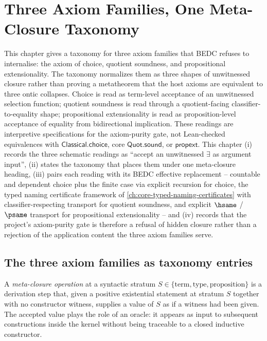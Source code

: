\chapter{Three Axiom Families, One Meta-Closure Taxonomy}
\label{ch:visions-three-axioms-one-closure}

This chapter gives a taxonomy for three axiom families that BEDC refuses to internalise: the axiom of choice, quotient soundness, and propositional extensionality. The taxonomy normalizes them as three shapes of unwitnessed closure rather than proving a metatheorem that the host axioms are equivalent to three ontic collapses. Choice is read as term-level acceptance of an unwitnessed selection function; quotient soundness is read through a quotient-facing classifier-to-equality shape; propositional extensionality is read as proposition-level acceptance of equality from bidirectional implication. These readings are interpretive specifications for the axiom-purity gate, not Lean-checked equivalences with $\mathsf{Classical.choice}$, core $\mathsf{Quot.sound}$, or $\mathsf{propext}$. This chapter (i) records the three schematic readings as ``accept an unwitnessed $\exists$ as argument input'', (ii) states the taxonomy that places them under one meta-closure heading, (iii) pairs each reading with its BEDC effective replacement -- countable and dependent choice plus the finite case via explicit recursion for choice, the typed naming certificate framework of \autoref{ch:core-typed-naming-certificates} with classifier-respecting transport for quotient soundness, and explicit $\hsame$ / $\psame$ transport for propositional extensionality -- and (iv) records that the project's axiom-purity gate is therefore a refusal of hidden closure rather than a rejection of the application content the three axiom families serve.

\section{The three axiom families as taxonomy entries}
\label{sec:three-axioms-one-closure-variants}

\begin{definition}
\label{def:three-axioms-meta-closure-operation}
A \emph{meta-closure operation} at a syntactic stratum $S \in \{\text{term}, \text{type}, \text{proposition}\}$ is a derivation step that, given a positive existential statement at stratum $S$ together with no constructor witness, supplies a value of $S$ as if a witness had been given. The accepted value plays the role of an oracle: it appears as input to subsequent constructions inside the kernel without being traceable to a closed inductive constructor.
\end{definition}

